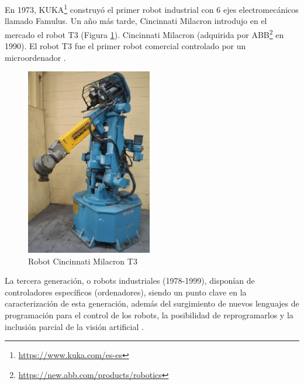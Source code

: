   
  
En 1973, KUKA\footnote{\url{https://www.kuka.com/es-es}} construyó el primer robot industrial con 6 ejes electromecánicos llamado Famulus. Un año más tarde, Cincinnati Milacron introdujo en el mercado el robot T3 (Figura \ref{fig:T3}). Cincinnati Milacron (adquirida por ABB\footnote{\url{https://new.abb.com/products/robotics}} en 1990). El robot T3 fue el primer robot comercial controlado por un microordenador \cite{Zamalloa17}.\\
  
  \begin{figure} [H]
    \begin{center}
      \includegraphics[width=55mm]{figs/T3_robot.png}
    \end{center}
    \caption{Robot Cincinnati Milacron T3}
    \label{fig:T3}
  \end{figure}
  
La tercera generación, o robots industriales (1978-1999), disponían de controladores específicos (ordenadores), siendo un punto clave en la caracterización de esta generación, además del surgimiento de nuevos lenguajes de programación para el control de los robots, la posibilidad de reprogramarlos y la inclusión parcial de la visión artificial \cite{Zamalloa17}.\\ %

